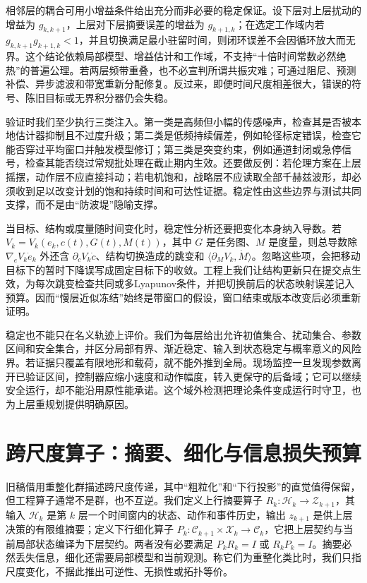 相邻层的耦合可用小增益条件给出充分而非必要的稳定保证。设下层对上层扰动的增益为 $g_{k,k+1}$，上层对下层摘要误差的增益为 $g_{k+1,k}$；在选定工作域内若 $g_{k,k+1}g_{k+1,k}<1$，并且切换满足最小驻留时间，则闭环误差不会因循环放大而无界。这个结论依赖局部模型、增益估计和工作域，不支持“十倍时间常数必然绝热”的普遍公理。若两层频带重叠，也不必宣判所谓共振灾难；可通过阻尼、预测补偿、异步滤波和带宽重新分配修复。反过来，即便时间尺度相差很大，错误的符号、陈旧目标或无界积分器仍会失稳。

验证时我们至少执行三类注入。第一类是高频但小幅的传感噪声，检查其是否被本地估计器抑制且不过度升级；第二类是低频持续偏差，例如轮径标定错误，检查它能否穿过平均窗口并触发模型修订；第三类是突变约束，例如通道封闭或急停信号，检查其能否绕过常规批处理在截止期内生效。还要做反例：若伦理方案在上层摇摆，动作层不应直接抖动；若电机饱和，战略层不应读取全部千赫兹波形，却必须收到足以改变计划的饱和持续时间和可达性证据。稳定性由这些边界与测试共同支撑，而不是由“防波堤”隐喻支撑。

当目标、结构或度量随时间变化时，稳定性分析还要把变化本身纳入导数。若 $V_k=V_k(e_k,c(t),G(t),M(t))$，其中 $G$ 是任务图、$M$ 是度量，则总导数除 $\nabla_eV_k\dot e_k$ 外还含 $\partial_cV_k\dot c$、结构切换造成的跳变和 $\langle\partial_MV_k,\dot M\rangle$。忽略这些项，会把移动目标下的暂时下降误写成固定目标下的收敛。工程上我们让结构更新只在提交点生效，为每次跳变检查共同或多Lyapunov条件，并把切换前后的状态映射误差记入预算。因而“慢层近似冻结”始终是带窗口的假设，窗口结束或版本改变后必须重新证明。

稳定也不能只在名义轨迹上评价。我们为每层给出允许初值集合、扰动集合、参数区间和安全集合，并区分局部有界、渐近稳定、输入到状态稳定与概率意义的风险界。若证据只覆盖有限地形和载荷，就不能外推到全局。现场监控一旦发现参数离开已验证区间，控制器应缩小速度和动作幅度，转入更保守的后备域；它可以继续安全运行，却不能沿用原性能承诺。这个域外检测把理论条件变成运行时守卫，也为上层重规划提供明确原因。

\section{跨尺度算子：摘要、细化与信息损失预算}
\label{sec:renormalization_group_flow}

旧稿借用重整化群描述跨尺度传递，其中“粗粒化”和“下行投影”的直觉值得保留，但工程算子通常不是群，也不互逆。我们定义上行摘要算子 $R_k:\mathcal H_k\to\mathcal Z_{k+1}$，其输入 $\mathcal H_k$ 是第 $k$ 层一个时间窗内的状态、动作和事件历史，输出 $z_{k+1}$ 是供上层决策的有限维摘要；定义下行细化算子 $P_k:\mathcal C_{k+1}\times\mathcal X_k\to\mathcal C_k$，它把上层契约与当前局部状态编译为下层契约。两者没有必要满足 $P_kR_k=I$ 或 $R_kP_k=I$。摘要必然丢失信息，细化还需要局部模型和当前观测。称它们为重整化类比时，我们只指尺度变化，不据此推出可逆性、无损性或拓扑等价。

